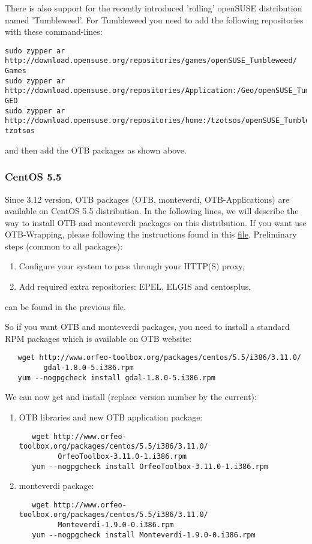 There is also support for the recently introduced 'rolling' openSUSE distribution named 'Tumbleweed'.
For Tumbleweed you need to add the following repositories with these command-lines:
\begin{verbatim}
sudo zypper ar 
http://download.opensuse.org/repositories/games/openSUSE_Tumbleweed/ Games
sudo zypper ar 
http://download.opensuse.org/repositories/Application:/Geo/openSUSE_Tumbleweed/ GEO
sudo zypper ar 
http://download.opensuse.org/repositories/home:/tzotsos/openSUSE_Tumbleweed/ tzotsos
\end{verbatim}
and then add the OTB packages as shown above.

\subsubsection{CentOS 5.5}
\label{ssec:centos_binaries}
Since 3.12 version, OTB packages (OTB, monteverdi, OTB-Applications) are available on CentOS 5.5 distribution. In the following lines, we will describe the way to install OTB and monteverdi packages on this distribution. If you want use OTB-Wrapping, please following the instructions found in this \href{http://www.orfeo-toolbox.org/packages/centos/5.5/i386/3.12.0/OTB_packages_on_CentOS_5.5.txt}{file}. Preliminary steps (common to all packages):

\begin{enumerate}

  \item Configure your system to pass through your HTTP(S) proxy,

  \item Add required extra repositories: EPEL, ELGIS and centosplus, 

\end{enumerate}
can be found in the previous file.

So if you want OTB and monteverdi packages, you need to install a standard RPM packages which is available on OTB website: 
   \begin{verbatim}
   wget http://www.orfeo-toolbox.org/packages/centos/5.5/i386/3.11.0/
         gdal-1.8.0-5.i386.rpm
   yum --nogpgcheck install gdal-1.8.0-5.i386.rpm
   \end{verbatim}
We can now get and install (replace version number by the current):

\begin{enumerate}
\item OTB libraries and new OTB application package: 
   \begin{verbatim}
   wget http://www.orfeo-toolbox.org/packages/centos/5.5/i386/3.11.0/
         OrfeoToolbox-3.11.0-1.i386.rpm
   yum --nogpgcheck install OrfeoToolbox-3.11.0-1.i386.rpm
   \end{verbatim}
\item monteverdi package:
   \begin{verbatim}
   wget http://www.orfeo-toolbox.org/packages/centos/5.5/i386/3.11.0/
         Monteverdi-1.9.0-0.i386.rpm
   yum --nogpgcheck install Monteverdi-1.9.0-0.i386.rpm
   \end{verbatim}
\end{enumerate}


